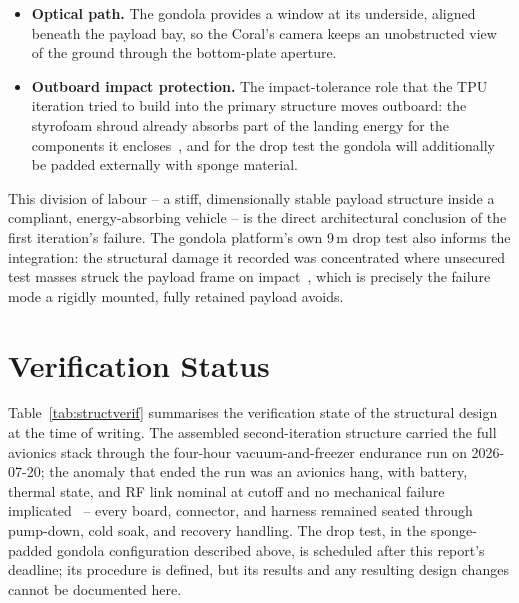 \begin{itemize}
  \item \textbf{Optical path.} The gondola provides a window at its
        underside, aligned beneath the payload bay, so the Coral's camera
        keeps an unobstructed view of the ground through the bottom-plate
        aperture.
  \item \textbf{Outboard impact protection.} The impact-tolerance role that
        the TPU iteration tried to build into the primary structure moves
        outboard: the styrofoam shroud already absorbs part of the landing
        energy for the components it encloses~\cite{kessler}, and for the
        drop test the gondola will additionally be padded externally with
        sponge material.
\end{itemize}

This division of labour -- a stiff, dimensionally stable payload structure
inside a compliant, energy-absorbing vehicle -- is the direct architectural
conclusion of the first iteration's failure. The gondola platform's own
9\,m drop test also informs the integration: the structural damage it
recorded was concentrated where unsecured test masses struck the payload
frame on impact~\cite{kessler}, which is precisely the failure mode a
rigidly mounted, fully retained payload avoids.

\section{Verification Status}

Table~\ref{tab:structverif} summarises the verification state of the
structural design at the time of writing. The assembled second-iteration
structure carried the full avionics stack through the four-hour
vacuum-and-freezer endurance run on 2026-07-20; the anomaly that ended the
run was an avionics hang, with battery, thermal state, and RF link nominal
at cutoff and no mechanical failure implicated~\cite{anomaly} -- every
board, connector, and harness remained seated through pump-down, cold soak,
and recovery handling. The drop test, in the sponge-padded gondola
configuration described above, is scheduled after this report's deadline;
its procedure is defined, but its results and any resulting design changes
cannot be documented here.

